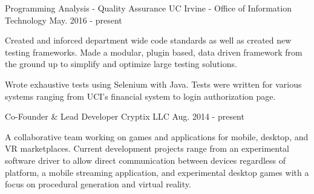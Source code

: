 

\begin{cventries}

  \cventry
    {Programming Analysis - Quality Assurance} %
    {UC Irvine - Office of Information Technology} %
    {} %
    {May. 2016 - present} %
    {
      \begin{cvitems} %
        \item {Created and inforced department wide code standards as well as %
        created new testing frameworks. Made a modular, plugin based, data driven %
        framework from the ground up to simplify and optimize large testing solutions.}
        \item {Wrote exhaustive tests using Selenium with Java. Tests were written %
        for various systems ranging from UCI's financial system to login %
        authorization page.}
      \end{cvitems}
    }

  \cventry
    {Co-Founder \& Lead Developer} %
    {Cryptix LLC} %
    {} %
    {Aug. 2014 - present} %
    {
      \begin{cvitems} %
        \item {A collaborative team working on games and applications for %
        mobile, desktop, and VR marketplaces. Current development projects range %
        from an experimental software driver to allow direct communication %
        between devices regardless of platform, a mobile streaming application, %
        and experimental desktop games with a focus on procedural generation and %
        virtual reality.}
      \end{cvitems}
    }


\end{cventries}
